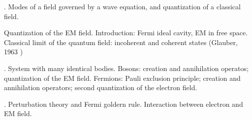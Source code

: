 \documentclass[letterpaper,10pt,english]{jupyterBook}
\begin{document}
\sphinxAtStartPar
{\hyperref[\detokenize{ch/quantum-mechanics/qft/field-quantization:quantum-mechanics-qft-field-quantization}]{}}. Modes of a field governed by a wave equation, and quantization of a classical field.

\sphinxAtStartPar
{\hyperref[\detokenize{ch/quantum-mechanics/qft/photons:quantum-mechanics-qft-photons}]{}} Quantization of the EM field. Introduction: Fermi ideal cavity, EM in free space. Classical limit of the quantum field: incoherent and coherent states (Glauber, 1963 )

\sphinxAtStartPar
{\hyperref[\detokenize{ch/quantum-mechanics/qft/multi-body:quantum-mechanics-qft-multi-body}]{}}. System with many identical bodies. Bosons: creation and annihilation operatos; quantization of the EM field. Fermions: Pauli exclusion principle; creation and annihilation operators; second quantization of the electron field.

\sphinxAtStartPar
{\hyperref[\detokenize{ch/quantum-mechanics/qft/interactions:quantum-mechanics-qft-interactions}]{}}. Perturbation theory and Fermi goldern rule. Interaction between electron and EM field.
\end{document}
